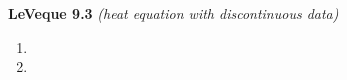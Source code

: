 \textbf{LeVeque 9.3} \textit{(heat equation with discontinuous data)}


\begin{enumerate}
  \item 
  \pagebreak
  \item 
\end{enumerate} 